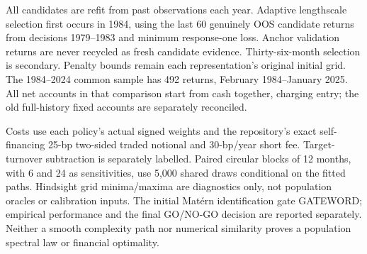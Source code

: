 \documentclass[11pt,letterpaper]{article}
\begin{document}
All candidates are refit from past observations each year. Adaptive lengthscale
selection first occurs in 1984, using the last 60 genuinely OOS candidate returns
from decisions 1979--1983 and minimum response-one loss. Anchor validation
returns are never recycled as fresh candidate evidence. Thirty-six-month selection
is secondary. Penalty bounds remain each representation's original initial grid.
The 1984--2024 common sample has 492 returns, February 1984--January 2025.
All net accounts in that comparison start from cash together, charging entry;
the old full-history fixed accounts are separately reconciled.

Costs use each policy's actual signed weights and the repository's exact
self-financing 25-bp two-sided traded notional and 30-bp/year short fee.
Target-turnover subtraction is separately labelled. Paired circular blocks of
12 months, with 6 and 24 as sensitivities, use 5,000 shared draws conditional on
the fitted paths. Hindsight grid minima/maxima are diagnostics only, not
population oracles or calibration inputs. The initial Mat\'ern identification gate
GATEWORD; empirical performance and the final GO/NO-GO decision are reported
separately. Neither a smooth complexity path nor numerical similarity proves a
population spectral law or financial optimality.
\end{document}
